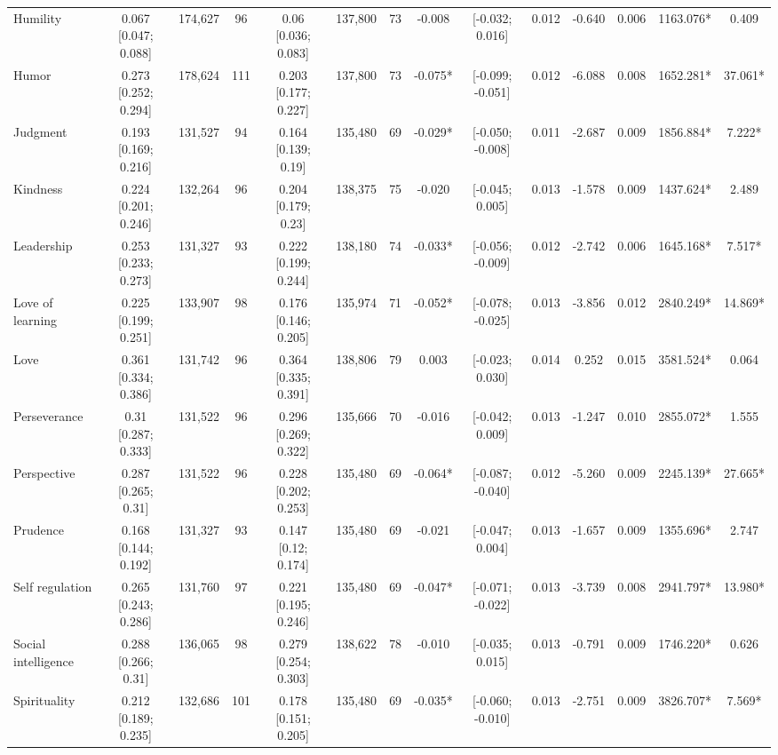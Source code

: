 \documentclass[
  man,floatsintext]{apa6}
\begin{document}
\begin{table}
{\begin{tabular}[t]{lccccccccccccc}
Humility & 0.067 [0.047; 0.088] & 174,627 & 96 & 0.06 [0.036; 0.083] & 137,800 & 73 & -0.008 & {}[-0.032;  0.016] & 0.012 & -0.640 & 0.006 & 1163.076* & 0.409\\
\addlinespace
Humor & 0.273 [0.252; 0.294] & 178,624 & 111 & 0.203 [0.177; 0.227] & 137,800 & 73 & -0.075* & {}[-0.099; -0.051] & 0.012 & -6.088 & 0.008 & 1652.281* & 37.061*\\
Judgment & 0.193 [0.169; 0.216] & 131,527 & 94 & 0.164 [0.139; 0.19] & 135,480 & 69 & -0.029* & {}[-0.050; -0.008] & 0.011 & -2.687 & 0.009 & 1856.884* & 7.222*\\
Kindness & 0.224 [0.201; 0.246] & 132,264 & 96 & 0.204 [0.179; 0.23] & 138,375 & 75 & -0.020 & {}[-0.045;  0.005] & 0.013 & -1.578 & 0.009 & 1437.624* & 2.489\\
Leadership & 0.253 [0.233; 0.273] & 131,327 & 93 & 0.222 [0.199; 0.244] & 138,180 & 74 & -0.033* & {}[-0.056; -0.009] & 0.012 & -2.742 & 0.006 & 1645.168* & 7.517*\\
Love of learning & 0.225 [0.199; 0.251] & 133,907 & 98 & 0.176 [0.146; 0.205] & 135,974 & 71 & -0.052* & {}[-0.078; -0.025] & 0.013 & -3.856 & 0.012 & 2840.249* & 14.869*\\
\addlinespace
Love & 0.361 [0.334; 0.386] & 131,742 & 96 & 0.364 [0.335; 0.391] & 138,806 & 79 & 0.003 & {}[-0.023;  0.030] & 0.014 & 0.252 & 0.015 & 3581.524* & 0.064\\
Perseverance & 0.31 [0.287; 0.333] & 131,522 & 96 & 0.296 [0.269; 0.322] & 135,666 & 70 & -0.016 & {}[-0.042;  0.009] & 0.013 & -1.247 & 0.010 & 2855.072* & 1.555\\
Perspective & 0.287 [0.265; 0.31] & 131,522 & 96 & 0.228 [0.202; 0.253] & 135,480 & 69 & -0.064* & {}[-0.087; -0.040] & 0.012 & -5.260 & 0.009 & 2245.139* & 27.665*\\
Prudence & 0.168 [0.144; 0.192] & 131,327 & 93 & 0.147 [0.12; 0.174] & 135,480 & 69 & -0.021 & {}[-0.047;  0.004] & 0.013 & -1.657 & 0.009 & 1355.696* & 2.747\\
Self regulation & 0.265 [0.243; 0.286] & 131,760 & 97 & 0.221 [0.195; 0.246] & 135,480 & 69 & -0.047* & {}[-0.071; -0.022] & 0.013 & -3.739 & 0.008 & 2941.797* & 13.980*\\
\addlinespace
Social intelligence & 0.288 [0.266; 0.31] & 136,065 & 98 & 0.279 [0.254; 0.303] & 138,622 & 78 & -0.010 & {}[-0.035;  0.015] & 0.013 & -0.791 & 0.009 & 1746.220* & 0.626\\
Spirituality & 0.212 [0.189; 0.235] & 132,686 & 101 & 0.178 [0.151; 0.205] & 135,480 & 69 & -0.035* & {}[-0.060; -0.010] & 0.013 & -2.751 & 0.009 & 3826.707* & 7.569*\\

\end{tabular}}
\end{table}
\end{document}
